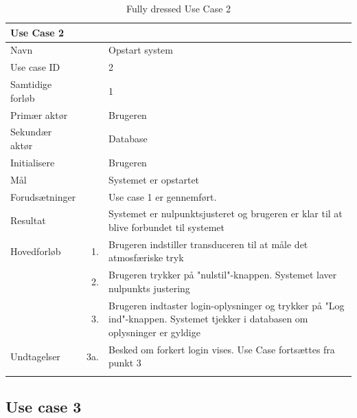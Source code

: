 \begin{longtabu} to  %
    {\large \textbf{Use Case 2}} && \\
    \toprule
    Navn &&    Opstart system\\
    Use case ID &&    2\\
    Samtidige forløb &&    1\\
    Primær aktør &&    Brugeren\\
    Sekundær aktør && Database\\
    Initialisere &&    Brugeren\\
    Mål && Systemet er opstartet\\
    Forudsætninger &&  Use case 1 er gennemført.\\
    Resultat &&    Systemet er nulpunktsjusteret og brugeren er klar til at blive forbundet til systemet\\
    \midrule
    Hovedforløb &   1. & Brugeren indstiller transduceren til at måle det atmosfæriske tryk\\ 
    	&			2. & Brugeren trykker på "nulstil"\--knappen. Systemet laver nulpunkts justering \\ 
    	&			3. &    Brugeren indtaster login-oplysninger og trykker på "Log ind"\--knappen. Systemet tjekker i databasen om oplysninger er gyldige \\
    	\midrule
    Undtagelser &    3a. & Besked om forkert login vises. Use Case fortsættes fra punkt 3     \\ \bottomrule    
\caption{Fully dressed Use Case 2}
\label{UC2}
\end{longtabu}

\subsection{Use case 3}

